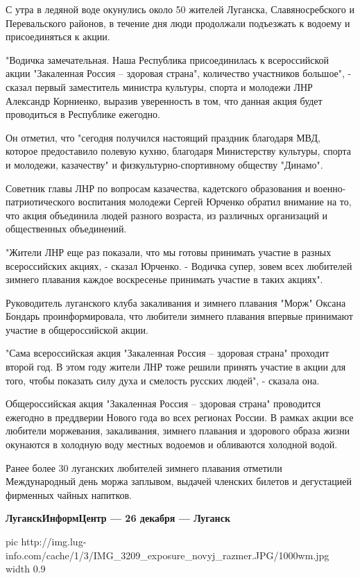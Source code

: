 С утра в ледяной воде окунулись около 50 жителей Луганска, Славяносребского и
Перевальского районов, в течение дня люди продолжали подъезжать к водоему и
присоединяться к акции.

"Водичка замечательная. Наша Республика присоединилась к всероссийской акции
"Закаленная Россия – здоровая страна", количество участников большое", - сказал
первый заместитель министра культуры, спорта и молодежи ЛНР Александр
Корниенко, выразив уверенность в том, что данная акция будет проводиться в
Республике ежегодно.

Он отметил, что "сегодня получился настоящий праздник благодаря МВД, которое
предоставило полевую кухню, благодаря Министерству культуры, спорта и молодежи,
казачеству" и физкультурно-спортивному обществу "Динамо".

Советник главы ЛНР по вопросам казачества, кадетского образования и
военно-патриотического воспитания молодежи Сергей Юрченко обратил внимание на
то, что акция объединила людей разного возраста, из различных организаций и
общественных объединений.

"Жители ЛНР еще раз показали, что мы готовы принимать участие в разных
всероссийских акциях, - сказал Юрченко. - Водичка супер, зовем всех любителей
зимнего плавания каждое воскресенье принимать участие в таких акциях".

Руководитель луганского клуба закаливания и зимнего плавания "Морж" Оксана
Бондарь проинформировала, что любители зимнего плавания впервые принимают
участие в общероссийской акции.

"Сама всероссийская акция "Закаленная Россия – здоровая страна" проходит второй
год. В этом году жители ЛНР тоже решили принять участие в акции для того, чтобы
показать силу духа и смелость русских людей", - сказала она.

Общероссийская акция "Закаленная Россия – здоровая страна" проводится ежегодно
в преддверии Нового года во всех регионах России.  В рамках акции все любители
моржевания, закаливания, зимнего плавания и здорового образа жизни окунаются в
холодную воду местных водоемов и обливаются холодной водой. 

Ранее более 30 луганских любителей зимнего плавания отметили Международный день
моржа заплывом, выдачей членских билетов и дегустацией фирменных чайных
напитков.

\textbf{ЛуганскИнформЦентр — 26 декабря — Луганск}

\ifcmt
  pic http://img.lug-info.com/cache/1/3/IMG_3209_exposure_novyj_razmer.JPG/1000wm.jpg
  width 0.9
\fi

